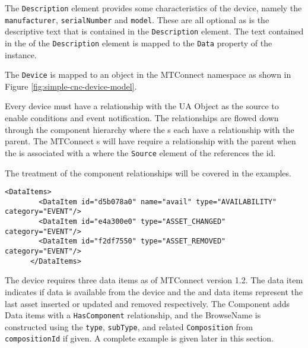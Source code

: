 The \texttt{Description} element provides some characteristics of the device, namely the \texttt{manufacturer}, \texttt{serialNumber} and \texttt{model}. These are all optional as is the descriptive text that is contained in the \texttt{Description} element. The text contained in the  of the \texttt{Description} element is mapped to the \texttt{Data} property of the  instance.

The \texttt{Device} is mapped to an  object in the MTConnect namespace as shown in Figure \ref{fig:simple-cnc-device-model}.



Every device must have a  relationship with the  UA Object as the source to enable conditions and event notification. The  relationships are flowed down through the component hierarchy where the s each have a  relationship with the parent. The MTConnect s will have require a  relationship with the parent  when the  is associated with a  where the \texttt{Source} element of the  references the  id. 

The treatment of the component relationships will be covered in the  examples.

\begin{lstlisting}[firstnumber=last,%
    caption={Device Data Items},label={lst:device-data-items}]
      <DataItems>
        <DataItem id="d5b078a0" name="avail" type="AVAILABILITY" category="EVENT"/>
        <DataItem id="e4a300e0" type="ASSET_CHANGED" category="EVENT"/>
        <DataItem id="f2df7550" type="ASSET_REMOVED" category="EVENT"/>
      </DataItems>
\end{lstlisting}

The device requires three data items as of MTConnect version 1.2. The  data item indicates if data is available from the device and the  and  data items represent the last asset inserted or updated and removed respectively. The Component adds Data items with a \texttt{Has\-Component} relationship, and the BrowseName is constructed using the \texttt{type}, \texttt{sub\-Type}, and related \texttt{Composition} from \texttt{compositionId} if given. A complete example is given later in this section.

